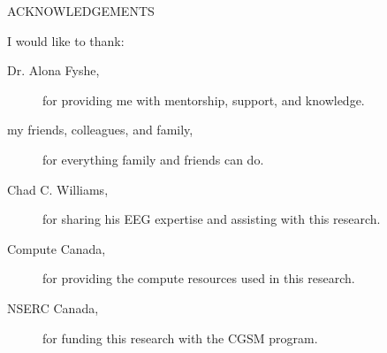 \newpage
{}

\begin{center}
  ACKNOWLEDGEMENTS
\end{center}

\noindent I would like to thank:
\begin{description}
  \item[Dr. Alona Fyshe,]
    for providing me with mentorship, support, and knowledge.
  \item[my friends, colleagues, and family,]
    for everything family and friends can do.
  \item[Chad C. Williams,]
    for sharing his EEG expertise and assisting with this research.
  \item[Compute Canada,]
    for providing the compute resources used in this research.
  \item[NSERC Canada,]
    for funding this research with the CGSM program.
\end{description}
